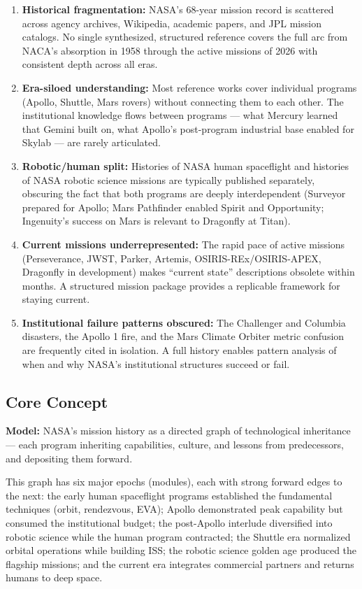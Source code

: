 \documentclass[11pt,letterpaper]{article}
\begin{document}
\begin{enumerate}[leftmargin=*, label=\textbf{P\arabic*.}]
  \item \textbf{Historical fragmentation:} NASA's 68-year mission record is scattered across agency archives, Wikipedia, academic papers, and JPL mission catalogs. No single synthesized, structured reference covers the full arc from NACA's absorption in 1958 through the active missions of 2026 with consistent depth across all eras.
  \item \textbf{Era-siloed understanding:} Most reference works cover individual programs (Apollo, Shuttle, Mars rovers) without connecting them to each other. The institutional knowledge flows between programs --- what Mercury learned that Gemini built on, what Apollo's post-program industrial base enabled for Skylab --- are rarely articulated.
  \item \textbf{Robotic/human split:} Histories of NASA human spaceflight and histories of NASA robotic science missions are typically published separately, obscuring the fact that both programs are deeply interdependent (Surveyor prepared for Apollo; Mars Pathfinder enabled Spirit and Opportunity; Ingenuity's success on Mars is relevant to Dragonfly at Titan).
  \item \textbf{Current missions underrepresented:} The rapid pace of active missions (Perseverance, JWST, Parker, Artemis, OSIRIS-REx/OSIRIS-APEX, Dragonfly in development) makes ``current state'' descriptions obsolete within months. A structured mission package provides a replicable framework for staying current.
  \item \textbf{Institutional failure patterns obscured:} The Challenger and Columbia disasters, the Apollo 1 fire, and the Mars Climate Orbiter metric confusion are frequently cited in isolation. A full history enables pattern analysis of when and why NASA's institutional structures succeed or fail.
\end{enumerate}

\subsection{Core Concept}

\textbf{Model:} NASA's mission history as a directed graph of technological inheritance --- each program inheriting capabilities, culture, and lessons from predecessors, and depositing them forward.

This graph has six major epochs (modules), each with strong forward edges to the next: the early human spaceflight programs established the fundamental techniques (orbit, rendezvous, EVA); Apollo demonstrated peak capability but consumed the institutional budget; the post-Apollo interlude diversified into robotic science while the human program contracted; the Shuttle era normalized orbital operations while building ISS; the robotic science golden age produced the flagship missions; and the current era integrates commercial partners and returns humans to deep space.
\end{document}
